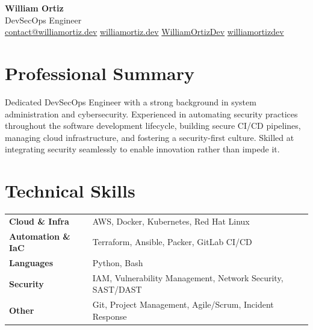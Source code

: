 \documentclass[11pt,letterpaper]{article}
\begin{document}
\begin{center}
    {\Huge\bfseries\color{darktext} William Ortiz} \\[6pt]
    {\large\color{primary} DevSecOps Engineer} \\[10pt]
    \color{graytext}
    \faEnvelope\enspace \href{mailto:contact@williamortiz.dev}{contact@williamortiz.dev} \quad
    \faGlobe\enspace \href{https://williamortiz.dev}{williamortiz.dev} \quad
    \faGithub\enspace \href{https://github.com/WilliamOrtizDev}{WilliamOrtizDev} \quad
    \faLinkedin\enspace \href{https://www.linkedin.com/in/williamortizdev/}{williamortizdev}
\end{center}

\vspace{0.5em}

\section{Professional Summary}

Dedicated DevSecOps Engineer with a strong background in system administration
and cybersecurity. Experienced in automating security practices throughout the
software development lifecycle, building secure CI/CD pipelines, managing cloud
infrastructure, and fostering a security-first culture. Skilled at integrating
security seamlessly to enable innovation rather than impede it.

\section{Technical Skills}

\begin{tabularx}{\textwidth}{@{} l X @{}}
    \textbf{Cloud \& Infra}    & AWS, Docker, Kubernetes, Red Hat Linux \\[3pt]
    \textbf{Automation \& IaC} & Terraform, Ansible, Packer, GitLab CI/CD \\[3pt]
    \textbf{Languages}         & Python, Bash \\[3pt]
    \textbf{Security}          & IAM, Vulnerability Management, Network Security, SAST/DAST \\[3pt]
    \textbf{Other}             & Git, Project Management, Agile/Scrum, Incident Response
\end{tabularx}
\end{document}
